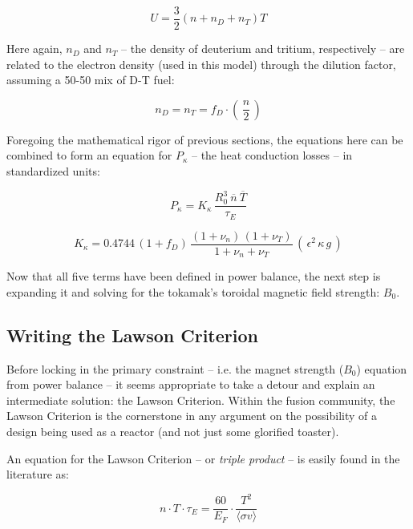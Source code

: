 \begin{equation}
	U = \frac{3}{2} \left( n + n_D + n_T \right) T
\end{equation}

Here again, $n_D$ and $n_T$ -- the density of deuterium and tritium, respectively -- are related to the electron density (used in this model) through the dilution factor, assuming a 50-50 mix of D-T fuel:

\begin{equation}
	n_D = n_T = f_D \cdot \left( \, \frac{n}{2} \, \right)
\end{equation}

Foregoing the mathematical rigor of previous sections, the equations here can be combined to form an equation for $P_\kappa$ -- the heat conduction losses -- in standardized units:

\begin{equation}
	\label{eq:pkappa}
	P_\kappa = K_\kappa \, \frac{ R_0 ^ 3 \ \overline{n}  \ \overline{T}  }{\tau_E} 
\end{equation}

\begin{equation}
	K_\kappa = 0.4744 \, ( 1 + f_D ) \, \frac{ (1 + \nu_n) \, (1 + \nu_T) }{1 + \nu_n + \nu_T } \, ( \, \epsilon^2 \, \kappa \, g \, )
\end{equation}

Now that all five terms have been defined in power balance, the next step is expanding it and solving for the tokamak's toroidal magnetic field strength: $B_0$.

\subsection{Writing the Lawson Criterion}

Before locking in the primary constraint -- i.e. the magnet strength ($B_0$) equation from power balance -- it seems appropriate to take a detour and explain an intermediate solution: the Lawson Criterion. Within the fusion community, the Lawson Criterion is the cornerstone in any argument on the possibility of a design being used as a reactor (and not just some glorified toaster). 

An equation for the Lawson Criterion -- or \emph{triple product} -- is easily found in the literature as:

\begin{equation}
	\label{eq:lawson}
	n \cdot T \cdot \tau_E = \frac{ 60 }{ E_F } \cdot \frac{ T ^ 2 }{ \langle \sigma v \rangle }
\end{equation}

